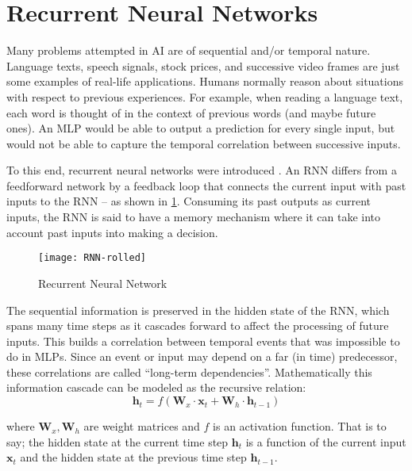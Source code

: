 
\section{Recurrent Neural Networks}
\label{sec:rnns}

Many problems attempted in AI are of sequential and/or temporal nature. Language texts, speech signals, stock prices, and successive video frames are just some examples of real-life applications. Humans normally reason about situations with respect to previous experiences. For example, when reading a language text, each word is thought of in the context of previous words (and maybe future ones). An MLP would be able to output a prediction for every single input, but would not be able to capture the temporal correlation between successive inputs.

To this end, recurrent neural networks were introduced \citep{hochreiter1991untersuchungen}. An RNN differs from a feedforward network by a feedback loop that connects the current input with past inputs to the RNN -- as shown in \cref{fig:rnn_rolled}. Consuming its past outputs as current inputs, the RNN is said to have a memory mechanism where it can take into account past inputs into making a decision.

\begin{figure}[ht]
\centering
\texttt{[image: RNN-rolled]}
\caption{Recurrent Neural Network \protect\footnotemark}
\label{fig:rnn_rolled}
\end{figure}

The sequential information is preserved in the hidden state of the RNN, which spans many time steps as it cascades forward to affect the processing of future inputs. This builds a correlation between temporal events that was impossible to do in MLPs. Since an event or input may depend on a far (in time) predecessor, these correlations are called ``long-term dependencies''. Mathematically this information cascade can be modeled as the recursive relation:
\[ \mathbf{h}_t = f (\mathbf{W}_x \cdot \mathbf{x}_t + \mathbf{W}_h \cdot \mathbf{h}_{t-1}) \]

where $\mathbf{W}_x, \mathbf{W}_h$ are weight matrices and $f$ is an activation function. That is to say; the hidden state at the current time step $\mathbf{h}_t$ is a function of the current input $\mathbf{x}_t$ and the hidden state at the previous time step $\mathbf{h}_{t-1}$.

